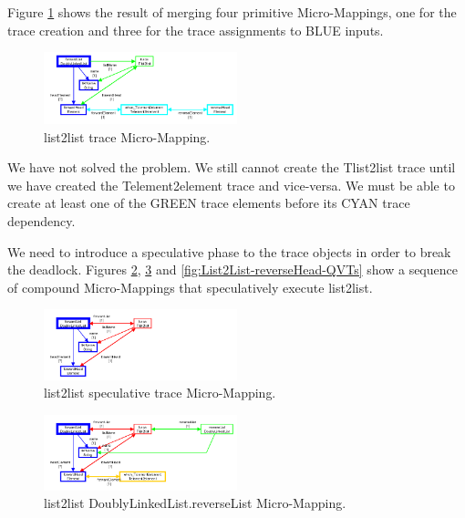 \documentclass[conference]{IEEEtran}
\begin{document}
Figure \ref{fig:List2List-trace-QVTs} shows the result of merging four primitive Micro-Mappings, one for the trace creation and three for the trace assignments to BLUE inputs.

\begin{figure}[h]
	\centering
	\includegraphics[width=0.5\textwidth]{List2List-trace-QVTs.png}
	\caption{list2list trace Micro-Mapping.}
	\label{fig:List2List-trace-QVTs}
\end{figure}

We have not solved the problem. We still cannot create the Tlist2list trace until we have created the Telement2element trace and vice-versa. We must be able to create at least one of the GREEN trace elements before its CYAN trace dependency.

We need to introduce a speculative phase to the trace objects in order to break the deadlock. Figures \ref{fig:List2List-speculative-trace-QVTs}, \ref{fig:List2List-reverseList-QVTs} and \ref{fig:List2List-reverseHead-QVTs} show a sequence of compound Micro-Mappings that speculatively execute list2list.

\begin{figure}[h]
	\centering
	\includegraphics[width=0.5\textwidth]{List2List-speculative-trace-QVTs.png}
	\caption{list2list speculative trace Micro-Mapping.}
	\label{fig:List2List-speculative-trace-QVTs}
\end{figure}

\begin{figure}[h]
	\centering
	\includegraphics[width=0.5\textwidth]{List2List-reverseList-QVTs.png}
	\caption{list2list DoublyLinkedList.reverseList Micro-Mapping.}
	\label{fig:List2List-reverseList-QVTs}
\end{figure}
\end{document}
